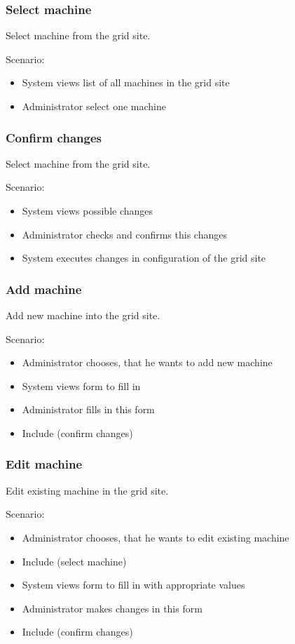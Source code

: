 \documentclass[12pt]{article}
\begin{document}
\subsubsection{Select machine}
Select machine from the grid site.

Scenario:
\begin{itemize}
\item{System views list of all machines in the grid site}
\item{Administrator select one machine}
\end{itemize}

\subsubsection{Confirm changes}
Select machine from the grid site.

Scenario:
\begin{itemize}
\item{System views possible changes}
\item{Administrator checks and confirms this changes}
\item{System executes changes in configuration of the grid site}
\end{itemize}

\subsubsection{Add machine}
Add new machine into the grid site.

Scenario:
\begin{itemize}
\item{Administrator chooses, that he wants to add new machine}
\item{System views form to fill in}
\item{Administrator fills in this form}
\item{Include (confirm changes)}
\end{itemize}

\subsubsection{Edit machine}
Edit existing machine in the grid site.

Scenario:
\begin{itemize}
\item{Administrator chooses, that he wants to edit existing machine}
\item{Include (select machine)}
\item{System views form to fill in with appropriate values}
\item{Administrator makes changes in this form}
\item{Include (confirm changes)}
\end{itemize}
\end{document}

